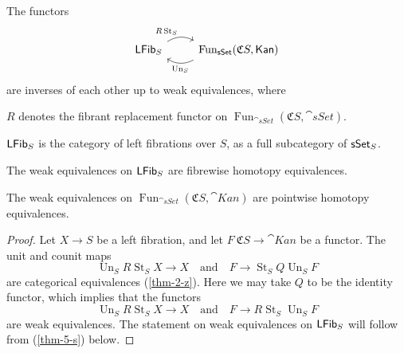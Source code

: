 \begin{corollary} \label{thm-5-gc}
    The functors 
    \[\begin{tikzcd}
        \smash{\cat{LFib}_{\/S}}\vphantom{1_1}\ar[r,bend left,start anchor=north east,end anchor=north west,"R\operatorname{St}_S"] &
        \operatorname{Fun}_{\cat{sSet}}(\mathfrak CS,\cat{Kan})\ar[l,bend left,start anchor=south west,end anchor=south east,"\operatorname{Un}_S"]
    \end{tikzcd}\]
    are inverses of each other up to weak equivalences, where 
    \begin{itms}
        \item $R$ denotes the fibrant replacement functor on
        $\operatorname{Fun}_{\cat{sSet}}(\mathfrak CS,\cat{sSet})$.
        \item $\mathsf{LFib}_{\/S}$ is the category of left fibrations over $S$,
        as a full subcategory of $\mathsf{sSet}_{\/S}$.
        \item The weak equivalences on $\mathsf{LFib}_{\/S}$
        are fibrewise homotopy equivalences.
        \item The weak equivalences on 
        $\operatorname{Fun}_{\cat{sSet}}(\mathfrak CS,\cat{Kan})$
        are pointwise homotopy equivalences.
    \end{itms}
\end{corollary}

\begin{proof}
    Let $X\to S$ be a left fibration, and let $F\:\mathfrak CS\to\cat{Kan}$ be a functor.
    The unit and counit maps
    \[ \operatorname{Un}_SR\operatorname{St}_SX\to X\quad\text{and}\quad F\to\operatorname{St}_SQ\operatorname{Un}_SF \]
    are categorical equivalences (\ref{thm-2-z}).
    Here we may take $Q$ to be the identity functor, 
    which implies that the functors
    \[ \operatorname{Un}_SR\operatorname{St}_SX\to X\quad\text{and}\quad F\to R\operatorname{St}_S\operatorname{Un}_SF \]
    are weak equivalences.
    The statement on weak equivalences on $\mathsf{LFib}_{\/S}$
    will follow from (\ref{thm-5-s}) below.
\end{proof}

